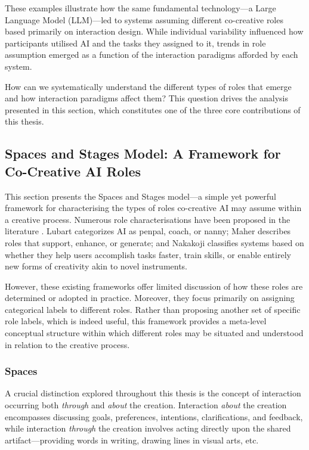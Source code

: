 These examples illustrate how the same fundamental technology—a Large Language Model (LLM)—led to systems assuming different co-creative roles based primarily on interaction design. While individual variability influenced how participants utilised AI and the tasks they assigned to it, trends in role assumption emerged as a function of the interaction paradigms afforded by each system.

How can we systematically understand the different types of roles that emerge and how interaction paradigms affect them? This question drives the analysis presented in this section, which constitutes one of the three core contributions of this thesis.

\subsection{Spaces and Stages Model: A Framework for Co-Creative AI Roles}

This section presents the Spaces and Stages model—a simple yet powerful framework for characterising the types of roles co-creative AI may assume within a creative process. Numerous role characterisations have been proposed in the literature \cite{lubart, kantosalo}. Lubart categorizes AI as penpal, coach, or nanny; Maher describes roles that support, enhance, or generate; and Nakakoji classifies systems based on whether they help users accomplish tasks faster, train skills, or enable entirely new forms of creativity akin to novel instruments.

However, these existing frameworks offer limited discussion of how these roles are determined or adopted in practice. Moreover, they focus primarily on assigning categorical labels to different roles. Rather than proposing another set of specific role labels, which is indeed useful, this framework provides a meta-level conceptual structure within which different roles may be situated and understood in relation to the creative process.

\subsubsection{Spaces}

A crucial distinction explored throughout this thesis is the concept of interaction occurring both \textit{through} and \textit{about} the creation. Interaction \textit{about} the creation encompasses discussing goals, preferences, intentions, clarifications, and feedback, while interaction \textit{through} the creation involves acting directly upon the shared artifact—providing words in writing, drawing lines in visual arts, etc.

